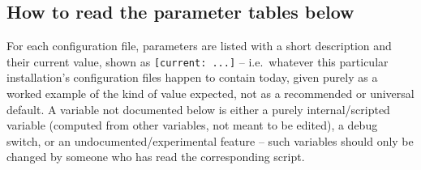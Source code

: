 \subsection{How to read the parameter tables below}
For each configuration file, parameters are listed with a short description and their current value,
shown as \texttt{[current: ...]} -- i.e.\ whatever this particular installation's configuration files
happen to contain today, given purely as a worked example of the kind of value expected, not as a
recommended or universal default. A variable not documented below is either a purely internal/scripted
variable (computed from other variables, not meant to be edited), a debug switch, or an
undocumented/experimental feature -- such variables should only be changed by someone who has read the
corresponding script.
